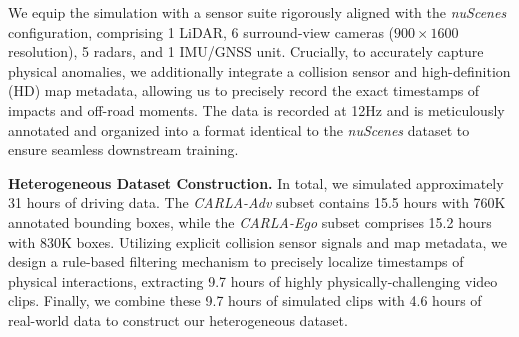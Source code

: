 \documentclass[runningheads]{llncs}
\begin{document}

We equip the simulation with a sensor suite rigorously aligned with the \textit{nuScenes} configuration, comprising 1 LiDAR, 6 surround-view cameras ($900 \times 1600$ resolution), 5 radars, and 1 IMU/GNSS unit. Crucially, to accurately capture physical anomalies, we additionally integrate a collision sensor and high-definition (HD) map metadata, allowing us to precisely record the exact timestamps of impacts and off-road moments. The data is recorded at 12Hz and is meticulously annotated and organized into a format identical to the \textit{nuScenes} dataset to ensure seamless downstream training.

\setlength{\parskip}{1pt}
\noindent \textbf{Heterogeneous Dataset Construction.} In total, we simulated approximately 31 hours of driving data. The \textit{CARLA-Adv} subset contains 15.5 hours with 760K annotated bounding boxes, while the \textit{CARLA-Ego} subset comprises 15.2 hours with 830K boxes. Utilizing explicit collision sensor signals and map metadata, we design a rule-based filtering mechanism to precisely localize timestamps of physical interactions, extracting 9.7 hours of highly physically-challenging video clips. Finally, we combine these 9.7 hours of simulated clips with 4.6 hours of real-world data to construct our heterogeneous dataset. 




\end{document}
